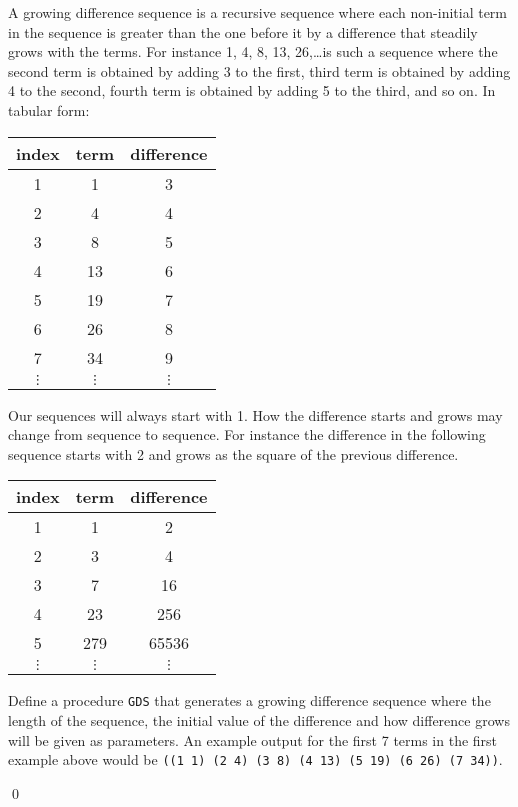 \documentclass[a4paper,11pt]{article}
\begin{document}
\begin{uexercise}

A growing difference sequence is a recursive sequence where each non-initial term in the sequence is greater than the one before it by a difference that steadily grows with the terms. For instance 1, 4, 8, 13, 26,\ldots is such a sequence where the second term is obtained by adding 3 to the first, third term is obtained by adding 4 to the second, fourth term is obtained by adding 5 to the third, and so on. In tabular form:

\begin{tabular}{|c|c|c|}
\hline 
index & term & difference \\
\hline
1 & 1 & 3 \\
\hline
2 & 4 & 4 \\
\hline
3 & 8 & 5 \\ 
\hline
4 & 13 & 6 \\
\hline
5 & 19 & 7 \\
\hline
6 & 26 & 8 \\
\hline
7 & 34 & 9 \\
\hline
$\vdots$ & $\vdots$ & $\vdots$
\end{tabular}

Our sequences will always start with 1. How the difference starts and grows may change from sequence to sequence. For instance the difference in the following sequence starts with 2 and grows as the square of the previous difference.

\begin{tabular}{|c|c|c|}
\hline 
index & term & difference \\
\hline
1 & 1 & 2 \\
\hline
2 & 3 & 4 \\
\hline
3 & 7 & 16 \\ 
\hline
4 & 23 & 256 \\
\hline
5 & 279 & 65536 \\
\hline
$\vdots$ & $\vdots$ & $\vdots$
\end{tabular}

Define a procedure \Verb+GDS+ that generates a growing difference sequence where the length of the sequence, the initial value of the difference and how difference grows will be given as parameters. An example output for the first 7 terms in the first example above would be \Verb+((1 1) (2 4) (3 8) (4 13) (5 19) (6 26) (7 34))+.

\qed
\end{uexercise}
\end{document}
